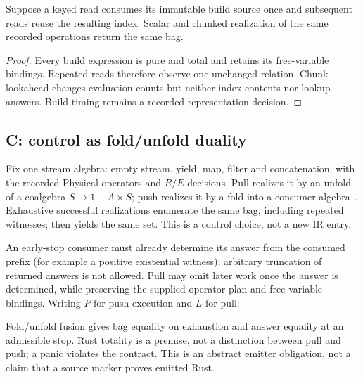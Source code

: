 \begin{lemma}
Suppose a keyed read consumes its immutable build source once and subsequent
reads reuse the resulting index. Scalar and chunked realization of the same
recorded operations return the same bag.
\end{lemma}
\begin{proof}
Every build expression is pure and total and retains its free-variable
bindings. Repeated reads therefore observe one unchanged relation. Chunk
lookahead changes evaluation counts but neither index contents nor lookup
answers. Build timing remains a recorded representation decision.
\end{proof}

\subsection{C: control as fold/unfold duality}
Fix one stream algebra: empty stream, yield, map, filter and concatenation,
with the recorded Physical operators and $R/E$ decisions. Pull realizes it
by an unfold of a coalgebra $S\to 1+A\times S$; push realizes it by a fold
into a consumer algebra~\cite{paper-pushpull}. Exhaustive successful
realizations enumerate the same bag, including repeated witnesses; 
then yields the same set. This is a control choice, not a new IR entry.

An early-stop consumer must already determine its answer from the consumed
prefix (for example a positive existential witness); arbitrary truncation of
returned answers is not allowed. Pull may omit later work once the answer is
determined, while preserving the supplied operator plan and free-variable
bindings. Writing $P$ for push execution and $L$ for pull:
\begin{mathpar}
\end{mathpar}
Fold/unfold fusion gives bag equality on exhaustion and answer equality at
an admissible stop. Rust totality is a premise, not a distinction between
pull and push; a panic violates the contract. This is an abstract emitter
obligation, not a claim that a source marker proves emitted Rust.
